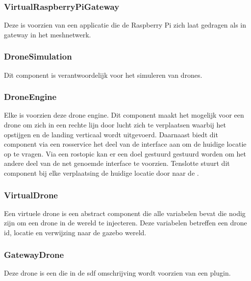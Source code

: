 \documentclass[a4paper, 11pt, oneside]{report}
\begin{document}
\subsubsection{VirtualRaspberryPiGateway}
\label{architectural:subcomponenten:VirtualRaspberryPiGateway}
Deze  is voorzien van een applicatie die de Raspberry Pi zich laat gedragen als in gateway in het meshnetwerk. 


\subsubsection{DroneSimulation}
\label{architectural:subcomponenten:DroneSimulation}
Dit component is verantwoordelijk voor het simuleren van drones. 

\subsubsection{DroneEngine}
\label{architectural:subcomponenten:DroneEngine}
Elke  is voorzien deze drone engine. 
Dit component maakt het mogelijk voor een drone om zich in een rechte lijn door lucht zich te verplaatsen waarbij het opstijgen en de landing verticaal wordt uitgevoerd.
Daarnaast biedt dit component via een rosservice het deel van de interface  aan om de huidige locatie op te vragen.
Via een rostopic kan er een doel gestuurd gestuurd worden om het andere deel van de net genoemde interface te voorzien.
Tenslotte stuurt dit component bij elke verplaatsing de huidige locatie door naar de . 

\subsubsection{VirtualDrone}
\label{architectural:subcomponenten:VirtualDrone}
Een virtuele drone is een abstract component die alle variabelen bevat die nodig zijn om een drone in de wereld te injecteren. Deze variabelen betreffen een drone id, locatie en verwijzing naar de gazebo wereld. 

\subsubsection{GatewayDrone}
\label{architectural:subcomponenten:GatewayDrone}
Deze drone is een  die in de sdf omschrijving wordt voorzien van een  plugin. 
\end{document}
